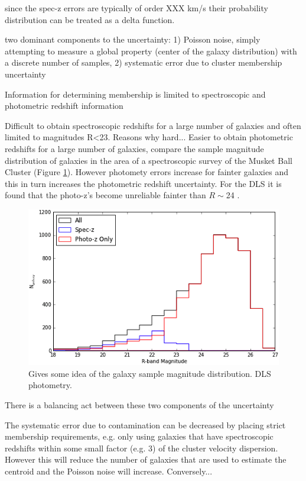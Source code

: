 since the spec-z errors are typically of order XXX km/s their probability distribution can be treated as a delta function.


two dominant components to the uncertainty: 1) Poisson noise, simply attempting to measure a global property (center of the galaxy distribution) with a discrete number of samples, 2) systematic error due to cluster membership uncertainty

Information for determining membership is limited to spectroscopic and photometric redshift information

Difficult to obtain spectroscopic redshifts for a large number of galaxies and often limited to magnitudes R<23. Reasons why hard...
Easier to obtain photometric redshifts for a large number of galaxies, compare the sample magnitude distribution of galaxies in the area of a spectroscopic survey of the Musket Ball Cluster (Figure \ref{figure:PhotozSpeczMagDist}).
However photomety errors increase for fainter galaxies and this in turn increases the photometric redshift uncertainty.  For the DLS it is found that the photo-z's become unreliable fainter than $R\sim$24 \citep{Schmidt:2013ig}.

\begin{figure}
	\centering
	\includegraphics[width=5in]{Chapter4/AnalysisFiles/magdist.png}
	\caption[Musket Ball Cluster spectroscopic and photometric magnitude distribution.]{Gives some idea of the galaxy sample magnitude distribution. DLS photometry.
		}
	\label{figure:PhotozSpeczMagDist}
\end{figure}

There is a balancing act between these two components of the uncertainty

The systematic error due to contamination can be decreased by placing strict membership requirements, e.g. only using galaxies that have spectroscopic redshifts within some small factor (e.g. 3) of the cluster velocity dispersion.
However this will reduce the number of galaxies that are used to estimate the centroid and the Poisson noise will increase.
Conversely...

